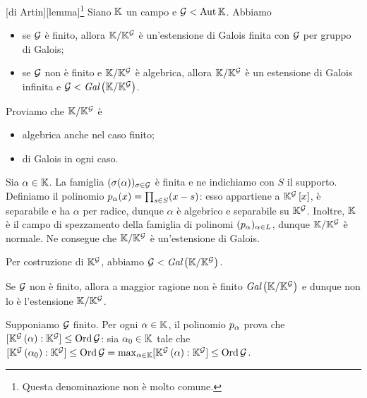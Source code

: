\begin{Lemma}
	[di Artin][lemma]\footnote{Questa denominazione non \`e molto comune.} Siano $\mathbb{K}$ un campo e $\mathcal{G} < \operatorname{Aut}{\mathbb{K}}$. Abbiamo
	\begin{itemize}
		\item se $\mathcal{G}$ \`e finito, allora $\mathbb{K}/\mathbb{K}^{\mathcal{G}}$ \`e un'estensione di Galois finita con $\mathcal{G}$ per gruppo di Galois;
		\item se $\mathcal{G}$ non \`e finito e $\mathbb{K}/\mathbb{K}^{\mathcal{G}}$ \`e algebrica, allora $\mathbb{K}/\mathbb{K}^{\mathcal{G}}$ \`e un estensione di Galois infinita e $\mathcal{G} < \textit{Gal} \left ( \mathbb{K}/\mathbb{K}^{\mathcal{G}} \right )$.
	\end{itemize}
\end{Lemma}
\Proof Proviamo che $\mathbb{K}/\mathbb{K}^{\mathcal{G}}$ \`e
\begin{itemize}
	\item algebrica anche nel caso finito;
	\item di Galois in ogni caso.
\end{itemize}
\par Sia $\alpha \in \mathbb{K}$. La famiglia $(\sigma(\alpha))_{\sigma \in \mathcal{G}}$ \`e finita e ne indichiamo con $S$ il supporto. Definiamo il polinomio $p_{\alpha}(x) = \prod_{s \in S}(x - s)$: esso appartiene a $\mathbb{K}^{\mathcal{G}} \left [ x \right ]$, \`e separabile e ha $\alpha$ per radice, dunque $\alpha$ \`e algebrico e separabile su $\mathbb{K}^{\mathcal{G}}$. Inoltre, $\mathbb{K}$ \`e il campo di spezzamento della famiglia di polinomi $(p_\alpha)_{\alpha \in L}$, dunque $\mathbb{K}/\mathbb{K}^{\mathcal{G}}$ \`e normale. Ne consegue che $\mathbb{K}/\mathbb{K}^{\mathcal{G}}$ \`e un'estensione di Galois.
\par Per costruzione di $\mathbb{K}^{\mathcal{G}}$, abbiamo $\mathcal{G} < \textit{Gal} \left ( \mathbb{K}/\mathbb{K}^{\mathcal{G}} \right )$.
\par Se $\mathcal{G}$ non \`e finito, allora a maggior ragione non \`e finito $\textit{Gal} \left ( \mathbb{K}/\mathbb{K}^{\mathcal{G}} \right )$ e dunque non lo \`e l'estensione $\mathbb{K}/\mathbb{K}^{\mathcal{G}}$.
\par Supponiamo $\mathcal{G}$ finito. Per ogni $\alpha \in \mathbb{K}$, il polinomio $p_\alpha$ prova che $[\mathbb{K}^{\mathcal{G}} \left ( \alpha \right ):\mathbb{K}^{\mathcal{G}}] \leq \operatorname{\operatorname{Ord}}{\mathcal{G}}$: sia $\alpha_0 \in \mathbb{K}$ tale che $[\mathbb{K}^{\mathcal{G}} \left ( \alpha_0 \right ):\mathbb{K}^{\mathcal{G}}] \leq \operatorname{\operatorname{Ord}}{\mathcal{G}} = \max_{\alpha \in \mathbb{K}} [\mathbb{K}^{\mathcal{G}} \left ( \alpha \right ):\mathbb{K}^{\mathcal{G}}] \leq \operatorname{\operatorname{Ord}}{\mathcal{G}}$.
